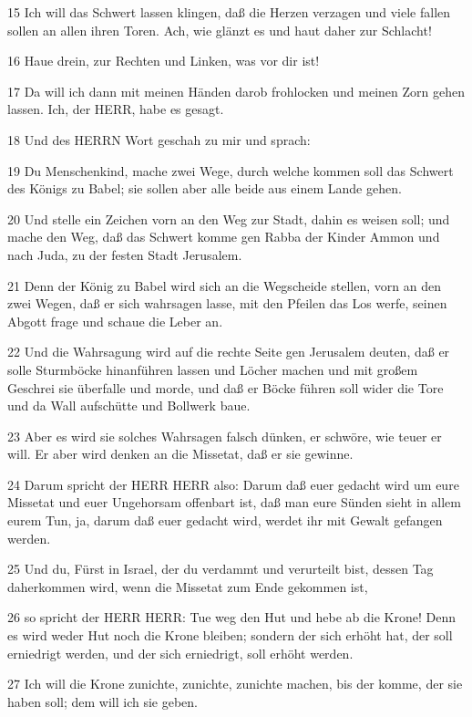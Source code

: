 \par 15 Ich will das Schwert lassen klingen, daß die Herzen verzagen und viele fallen sollen an allen ihren Toren. Ach, wie glänzt es und haut daher zur Schlacht!
\par 16 Haue drein, zur Rechten und Linken, was vor dir ist!
\par 17 Da will ich dann mit meinen Händen darob frohlocken und meinen Zorn gehen lassen. Ich, der HERR, habe es gesagt.
\par 18 Und des HERRN Wort geschah zu mir und sprach:
\par 19 Du Menschenkind, mache zwei Wege, durch welche kommen soll das Schwert des Königs zu Babel; sie sollen aber alle beide aus einem Lande gehen.
\par 20 Und stelle ein Zeichen vorn an den Weg zur Stadt, dahin es weisen soll; und mache den Weg, daß das Schwert komme gen Rabba der Kinder Ammon und nach Juda, zu der festen Stadt Jerusalem.
\par 21 Denn der König zu Babel wird sich an die Wegscheide stellen, vorn an den zwei Wegen, daß er sich wahrsagen lasse, mit den Pfeilen das Los werfe, seinen Abgott frage und schaue die Leber an.
\par 22 Und die Wahrsagung wird auf die rechte Seite gen Jerusalem deuten, daß er solle Sturmböcke hinanführen lassen und Löcher machen und mit großem Geschrei sie überfalle und morde, und daß er Böcke führen soll wider die Tore und da Wall aufschütte und Bollwerk baue.
\par 23 Aber es wird sie solches Wahrsagen falsch dünken, er schwöre, wie teuer er will. Er aber wird denken an die Missetat, daß er sie gewinne.
\par 24 Darum spricht der HERR HERR also: Darum daß euer gedacht wird um eure Missetat und euer Ungehorsam offenbart ist, daß man eure Sünden sieht in allem eurem Tun, ja, darum daß euer gedacht wird, werdet ihr mit Gewalt gefangen werden.
\par 25 Und du, Fürst in Israel, der du verdammt und verurteilt bist, dessen Tag daherkommen wird, wenn die Missetat zum Ende gekommen ist,
\par 26 so spricht der HERR HERR: Tue weg den Hut und hebe ab die Krone! Denn es wird weder Hut noch die Krone bleiben; sondern der sich erhöht hat, der soll erniedrigt werden, und der sich erniedrigt, soll erhöht werden.
\par 27 Ich will die Krone zunichte, zunichte, zunichte machen, bis der komme, der sie haben soll; dem will ich sie geben.

